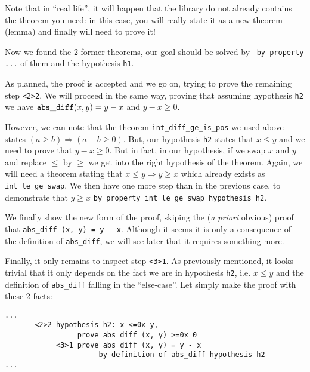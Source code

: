 \documentclass[11pt,a4paper,twoside,onecolumn,fullpage]{article}
\begin{document}
Note that in ``real life'', it will happen that the library do not already
contains the theorem you need: in this case, you will really state it
as a new theorem (lemma) and finally will need to prove it!

Now we found the 2 former theorems, our goal should be solved by
\zenon\ \lstinline"by property ..." of them and the hypothesis
\lstinline"h1".

{\scriptsize
}

As planned, the proof is accepted and we go on, trying to prove the
remaining step \lstinline"<2>2". We will proceed in the same way,
proving that assuming hypothesis \lstinline"h2" we have
${\tt abs\_diff} (x, y) = y - x$ and $y - x \ge 0$.

However, we can note that the theorem \lstinline"int_diff_ge_is_pos"
we used above states  $(a \ge b) \Rightarrow (a - b \ge 0)$.
But, our hypothesis \lstinline"h2" states that $x \le y$ and we need
to prove that $y -x \ge 0$. But in fact, in our hypothesis, if we swap $x$ and
$y$ and replace $\le$ by $\ge$ we get into the right hypothesis of the
theorem. Again, we will need a theorem stating that
$x \le y \Rightarrow y \ge x$ which already exists as
\lstinline"int_le_ge_swap". We then have one more step than in the
previous case, to demonstrate that $y \ge x$
\lstinline"by property int_le_ge_swap hypothesis h2".

\medskip
We finally show the new form of the proof, skiping the ({\em a priori}
obvious) proof that {\tt abs\_diff (x, y) = y - x}. Although it seems
it is only a consequence of the definition of \lstinline{abs_diff}, we
will see later that it requires something more.

{\scriptsize
}

Finally, it only remains to inspect step \lstinline"<3>1". As
previously mentioned, it looks trivial that it only depends on the
fact we are in hypothesis \lstinline"h2", i.e. $x \le y$ and the
definition of \lstinline"abs_diff" falling in the ``else-case''. Let
simply make the proof with these 2 facts:

{\scriptsize
\begin{lstlisting}
...
       <2>2 hypothesis h2: x <=0x y,
                 prove abs_diff (x, y) >=0x 0
            <3>1 prove abs_diff (x, y) = y - x
                      by definition of abs_diff hypothesis h2
...
\end{lstlisting}}
\end{document}
